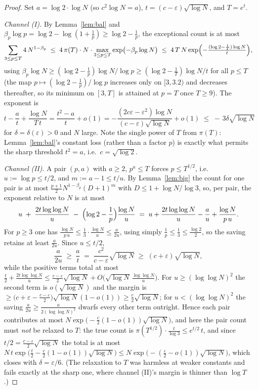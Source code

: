 \documentclass[11pt]{article}
\newcommand{\eps}{\varepsilon}
\begin{document}
\begin{proof}
Set $a=\log2\cdot\log N$ (so $c^2\log N=a$), $t=(c-\eps)\sqrt{\log N}$, and
$T=e^{t}$.

\emph{Channel (I).}  By Lemma~\ref{lem:bal} and
$\beta_p\log p=\log2-\log(1+\tfrac1p)\ge\log2-\tfrac1p$, the exceptional
count is at most
\[
\sum_{3\le p\le T}4\,N^{1-\beta_p}
\;\le\;4\,\pi(T)\cdot N\cdot
\max_{3\le p\le T}\exp\bigl(-\beta_p\log N\bigr)
\;\le\;4\,T\,N\exp\Bigl(-\tfrac{(\log2-\frac1T)\log N}{t}\Bigr),
\]
using $\beta_p\log N\ge(\log2-\tfrac1p)\log N/\log p
\ge(\log2-\tfrac1T)\log N/t$ for all $p\le T$ (the map
$p\mapsto(\log2-\tfrac1p)/\log p$ increases only on $[3,3.2)$ and decreases
thereafter, so its minimum on $[3,T]$ is attained at $p=T$ once $T\ge9$).
The exponent is
\[
t-\frac{a}{t}+\frac{\log N}{T\,t}
=\frac{t^{2}-a}{t}+o(1)
=-\frac{(2c\eps-\eps^{2})\log N}{(c-\eps)\sqrt{\log N}}+o(1)
\;\le\;-\,3\delta\sqrt{\log N}
\]
for $\delta=\delta(\eps)>0$ and $N$ large.  Note the single power of $T$
from $\pi(T)$: Lemma~\ref{lem:bal}'s constant loss (rather than a factor
$p$) is exactly what permits the sharp threshold $t^2=a$, i.e.\
$c=\sqrt{\log2}$.

\emph{Channel (II).}  A pair $(p,a)$ with $a\ge2$, $p^{a}\le T$ forces
$p\le T^{1/2}$, i.e.\ $u:=\log p\le t/2$, and $m:=a-1\le t/u$.  By
Lemma~\ref{lem:big} the count for one pair is at most
$\frac{p+1}2N^{1-\beta_p}(D+1)^{m}$ with $D\le1+\log N/\log3$, so, per pair,
the exponent relative to $N$ is at most
\[
u\;+\;\frac{2t\log\log N}{u}\;-\;\Bigl(\log2-\frac1p\Bigr)\frac{\log N}{u}
\;=\;u+\frac{2t\log\log N}{u}-\frac{a}{u}+\frac{\log N}{p\,u}.
\]
For $p\ge3$ one has $\frac{\log N}{p\,u}\le\frac13\cdot\frac{\log N}{u}
\le\frac{a}{2u}$, using simply $\frac1p\le\frac13\le\frac{\log2}2$, so the
saving retains at least $\frac{a}{2u}$.  Since $u\le t/2$,
\[
\frac{a}{2u}\;\ge\;\frac{a}{t}\;=\;\frac{c^{2}}{c-\eps}\sqrt{\log N}
\;\ge\;(c+\eps)\sqrt{\log N},
\]
while the positive terms total at most
$\tfrac t2+\tfrac{2t\log\log N}{u}\le
\tfrac{c-\eps}2\sqrt{\log N}+O\bigl(\sqrt{\log N}\,\tfrac{\log\log N}{u}\bigr)$.
For $u\ge(\log\log N)^{2}$ the second term is $o(\sqrt{\log N})$ and the
margin is $\ge\bigl(c+\eps-\tfrac{c-\eps}2\bigr)\sqrt{\log N}(1-o(1))
\ge\tfrac c2\sqrt{\log N}$; for $u<(\log\log N)^{2}$ the saving
$\frac{a}{2u}\ge\frac{a}{2(\log\log N)^{2}}$ dwarfs every other term
outright.  Hence each pair contributes at most
$N\exp\bigl(-\tfrac c2(1-o(1))\sqrt{\log N}\bigr)$, and here the pair count
must \emph{not} be relaxed to $T$: the true count is
$\pi(T^{1/2})\cdot\tfrac{t}{\log3}\le e^{t/2}\,t$, and since
$t/2=\tfrac{c-\eps}2\sqrt{\log N}$ the total is at most
$N\,t\exp\bigl(\tfrac{t}2-\tfrac c2(1-o(1))\sqrt{\log N}\bigr)
\le N\exp\bigl(-(\tfrac\eps2-o(1))\sqrt{\log N}\bigr)$, which closes with
$\delta=\eps/6$.  (The relaxation to $T$ was harmless at weaker constants and
fails exactly at the sharp one, where channel (II)'s margin is thinner than
$\log T$.)


\end{proof}
\end{document}
